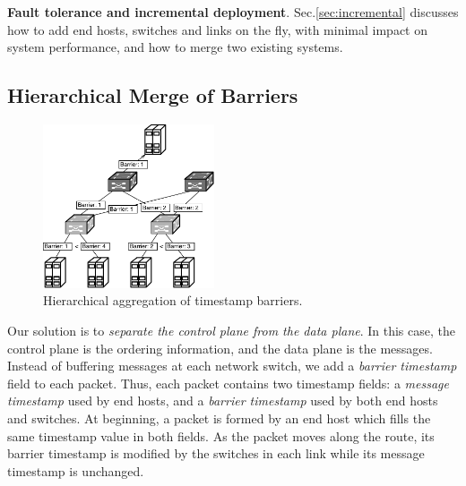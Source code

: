 \textbf{Fault tolerance and incremental deployment}.
Sec.\ref{sec:incremental} discusses how to add end hosts, switches and links on the fly, with minimal impact on system performance, and how to merge two existing \sys systems.



\subsection{Hierarchical Merge of Barriers}
\label{sec:ideal}

\begin{figure}[t]
\centering
\includegraphics[width=0.45\textwidth]{images/hierarchical_merge.pdf}
\caption{Hierarchical aggregation of timestamp barriers.}
\label{fig:hierarchical_merge}
\vspace{-0.9em}
\end{figure}

Our solution is to \textit{separate the control plane from the data plane}.
{In this case, the control plane is the ordering information, and the data plane is the messages.
Instead of buffering messages at each network switch, we add a \textit{barrier timestamp} field to each packet.
Thus, each packet contains two timestamp fields: a \textit{message timestamp} used by end hosts, and a \textit{barrier timestamp} used by both end hosts and switches. 
At beginning, a packet is formed by an end host which fills the same timestamp value in both fields.
As the packet moves along the route,  its barrier timestamp is modified by the switches in each link while its message timestamp is unchanged.}

